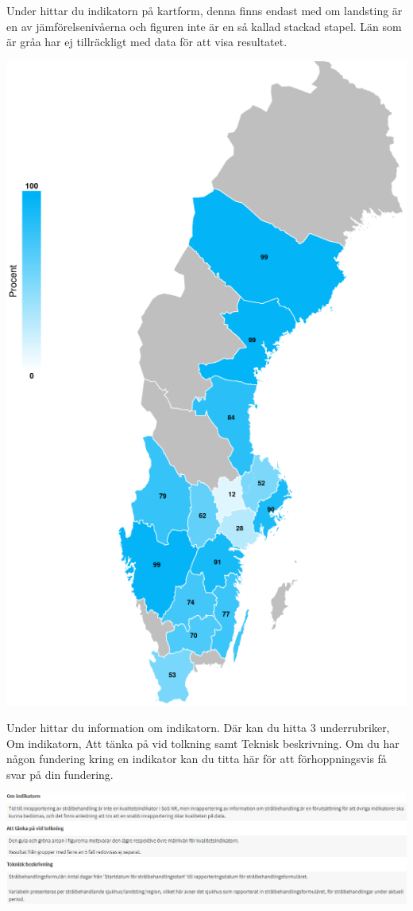 \documentclass[10pt, a4paper,twoside]{report}
\begin{document}
Under \textcolor{useblue}{\selectfont{Karta}} hittar du indikatorn på kartform, denna finns endast med om landsting är en av jämförelsenivåerna och figuren inte är en så kallad stackad stapel. Län som är gråa har ej tillräckligt med data för att visa resultatet.

\includegraphics[]{figurer/Karta}
\newline
\clearpage

Under \textcolor{useblue}{\selectfont{Beskrivning}} hittar du information om indikatorn. Där kan du hitta 3 underrubriker, Om indikatorn, Att tänka på vid tolkning samt Teknisk beskrivning. Om du har någon fundering kring en indikator kan du titta här för att förhoppningsvis få svar på din fundering.

\includegraphics[]{figurer/Beskrivning}
\newline
\end{document}
